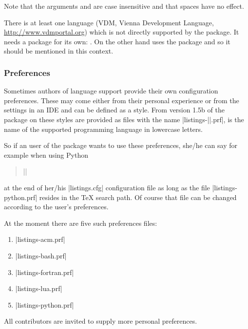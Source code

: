 \begin{paracol}{2}
Note that the arguments  and  are case
insensitive and that spaces have no effect.

There is at least one language (VDM, Vienna Development Language,
\url{http://www.vdmportal.org}) which is not directly supported by the
 package. It needs a package for its own:
. On the other hand  uses
the  package and so it should be mentioned in this
context.


\subsubsection{Preferences}\label{uPreferences}

Sometimes authors of language support provide their own configuration
preferences. These may come either from their personal experience or
from the settings in an IDE and can be defined as a 
style. From version 1.5b of the  package on these
styles are provided as files with the name
|listings-||.prf|,  is the name of the
supported programming language in lowercase letters.

So if an user of the  package wants to use these
preferences, she/he can say for example when using Python
\begin{quote}
    ||
\end{quote}
at the end of her/his |listings.cfg| configuration file as long as the
file |listings-python.prf| resides in the \TeX{} search path. Of course
that file can be changed according to the user's preferences.

At the moment there are five such preferences files:
\begin{enumerate}
  \item |listings-acm.prf|
  \item |listings-bash.prf|
  \item |listings-fortran.prf|
  \item |listings-lua.prf|
  \item |listings-python.prf|
\end{enumerate}
All contributors are invited to supply more personal preferences.

\end{paracol}